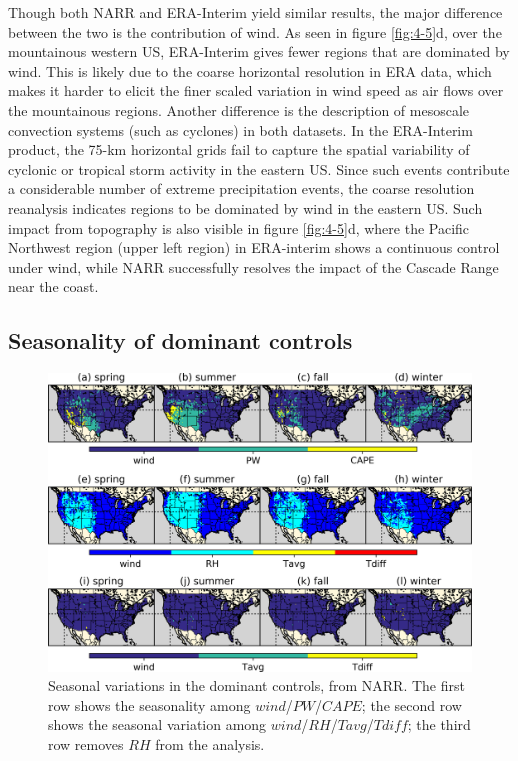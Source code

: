 Though both NARR and ERA-Interim yield similar results, the major difference between the two is the contribution of wind. As seen in figure \ref{fig:4-5}d, over the mountainous western US, ERA-Interim gives fewer regions that are dominated by wind. This is likely due to the coarse horizontal resolution in ERA data, which makes it harder to elicit the finer scaled variation in wind speed as air flows over the mountainous regions. Another difference is the description of mesoscale convection systems (such as cyclones) in both datasets. In the ERA-Interim product, the 75-km horizontal grids fail to capture the spatial variability of cyclonic or tropical storm activity in the eastern US. Since such events contribute a considerable number of extreme precipitation events, the coarse resolution reanalysis indicates regions to be dominated by wind in the eastern US. Such impact from topography is also visible in figure \ref{fig:4-5}d, where the Pacific Northwest region (upper left region) in ERA-interim shows a continuous control under wind, while NARR successfully resolves the impact of the Cascade Range near the coast.

\subsection{Seasonality of dominant controls}

\begin{figure}[htbp]
	\includegraphics[width=\linewidth]{pics/ch4/fig6.png}
	\caption{Seasonal variations in the dominant controls, from NARR. The first row shows the seasonality among $wind$/$PW$/$CAPE$; the second row shows the seasonal variation among $wind$/$RH$/$Tavg$/$Tdiff$; the third row removes $RH$ from the analysis.}
	\label{fig:4-6}
\end{figure}

